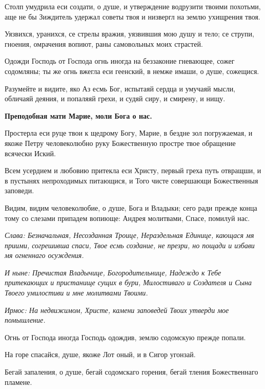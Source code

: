 Столп умудрила еси создати, о душе, и утверждение водрузити твоими похотьми, аще не бы Зиждитель удержал советы твоя и низвергл на землю ухищрения твоя.


Уязвихся, уранихся, се стрелы вражия, уязвившия мою душу и тело; се струпи, гноения, омрачения вопиют, раны самовольных моих страстей.


Одожди Господь от Господа огнь иногда на беззаконие гневающее, сожег содомляны; ты же огнь вжегла еси геенский, в немже имаши, о душе, сожещися.


Разумейте и видите, яко Аз есмь Бог, испытаяй сердца и умучаяй мысли, обличаяй деяния, и попаляяй грехи, и судяй сиру, и смирену, и нищу.


\bfseries Преподобная мати Марие, моли Бога о нас.


\normalfont{}Простерла еси руце твои к щедрому Богу, Марие, в бездне зол погружаемая, и якоже Петру человеколюбно руку Божественную простре твое обращение всячески Иский.




Всем усердием и любовию притекла еси Христу, первый греха путь отвращши, и в пустынях непроходимых питающися, и Того чисте совершающи Божественныя заповеди.




Видим, видим человеколюбие, о душе, Бога и Владыки; сего ради прежде конца тому со слезами припадем вопиюще: Андрея молитвами, Спасе, помилуй нас.


\itshape Слава\normalfont{}: Безначальная, Несозданная Троице, Нераздельная Единице, кающася мя приими, согрешивша спаси, Твое есмь создание, не презри, но пощади и избави мя огненнаго осуждения.


\itshape И ныне\normalfont{}: Пречистая Владычице, Богородительнице, Надеждо к Тебе притекающих и пристанище сущих в бури, Милостиваго и Создателя и Сына Твоего умилостиви и мне молитвами Твоими. 



\itshape Ирмос\normalfont{}: На недвижимом, Христе, камени заповедей Твоих утверди мое помышление.


Огнь от Господа иногда Господь одождив, землю содомскую прежде попали.


На горе спасайся, душе, якоже Лот оный, и в Сигор угонзай.


Бегай запаления, о душе, бегай содомскаго горения, бегай тления Божественнаго пламене.


